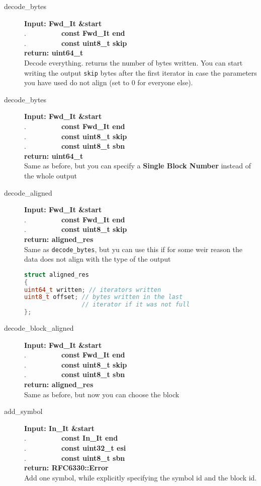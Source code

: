 \documentclass[11pt,a4paper]{refart}
\begin{document}
\begin{description}
\item[decode\_bytes] \textbf{Input: Fwd\_It \&start}\\
.\ \ \ \ \ \ \ \ \ \ \textbf{const Fwd\_It end}\\
.\ \ \ \ \ \ \ \ \ \ \textbf{const uint8\_t skip}\\
\textbf{return: uint64\_t}\\
Decode everything. returns the number of bytes written. You can start writing the output \texttt{skip} bytes after the first iterator in case the parameters you have used do not align (set to $0$ for everyone else).
\item[decode\_bytes] \textbf{Input: Fwd\_It \&start}\\
.\ \ \ \ \ \ \ \ \ \ \textbf{const Fwd\_It end}\\
.\ \ \ \ \ \ \ \ \ \ \textbf{const uint8\_t skip}\\
.\ \ \ \ \ \ \ \ \ \ \textbf{const uint8\_t sbn}\\
\textbf{return: uint64\_t}\\
Same as before, but you can specify a \textbf{Single Block Number} instead of the whole output

\item[decode\_aligned]\textbf{Input: Fwd\_It \&start}\\
.\ \ \ \ \ \ \ \ \ \ \textbf{const Fwd\_It end}\\
.\ \ \ \ \ \ \ \ \ \ \textbf{const uint8\_t skip}\\
\textbf{return: aligned\_res}\\
Same as \texttt{decode\_bytes}, but yu can use this if for some weir reason the data does not align with the type of the output
\begin{lstlisting}[language=C++]
struct aligned_res
{
uint64_t written; // iterators written
uint8_t offset; // bytes written in the last
				// iterator if it was not full
};
\end{lstlisting}
\item[decode\_block\_aligned]\textbf{Input: Fwd\_It \&start}\\
.\ \ \ \ \ \ \ \ \ \ \textbf{const Fwd\_It end}\\
.\ \ \ \ \ \ \ \ \ \ \textbf{const uint8\_t skip}\\
.\ \ \ \ \ \ \ \ \ \ \textbf{const uint8\_t sbn}\\
\textbf{return: aligned\_res}\\
Same as before, but now you can choose the block


\item[add\_symbol]\textbf{Input: In\_It \&start}\\
.\ \ \ \ \ \ \ \ \ \ \textbf{const In\_It end}\\
.\ \ \ \ \ \ \ \ \ \ \textbf{const uint32\_t esi}\\
.\ \ \ \ \ \ \ \ \ \ \textbf{const uint8\_t sbn}\\
\textbf{return: RFC6330::Error}\\
Add one symbol, while explicitly specifying the symbol id and the block id.


\end{description}
\end{document}

